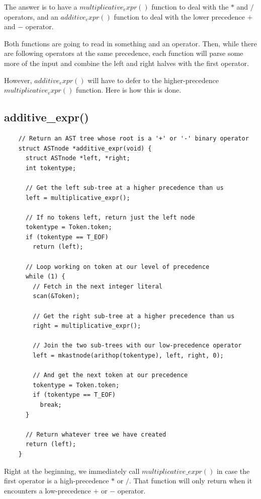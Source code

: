 \documentclass[journal, onecolumn, 12pt]{IEEEtran}
\begin{document}
The answer is to have a $multiplicative_expr()$ function to deal with the $*$ and $/$ operators, and an $additive_expr()$ function to deal with the lower precedence $+$ and $-$ operator.

Both functions are going to read in something and an operator. Then, while there are following operators at the same precedence, each function will parse some more of the input and combine the left and right halves with the first operator.

However, $additive_expr()$ will have to defer to the higher-precedence $multiplicative_expr()$ function. Here is how this is done.

\subsection{additive\_expr()}

\begin{lstlisting}
    // Return an AST tree whose root is a '+' or '-' binary operator
    struct ASTnode *additive_expr(void) {
      struct ASTnode *left, *right;
      int tokentype;

      // Get the left sub-tree at a higher precedence than us
      left = multiplicative_expr();

      // If no tokens left, return just the left node
      tokentype = Token.token;
      if (tokentype == T_EOF)
        return (left);

      // Loop working on token at our level of precedence
      while (1) {
        // Fetch in the next integer literal
        scan(&Token);

        // Get the right sub-tree at a higher precedence than us
        right = multiplicative_expr();

        // Join the two sub-trees with our low-precedence operator
        left = mkastnode(arithop(tokentype), left, right, 0);

        // And get the next token at our precedence
        tokentype = Token.token;
        if (tokentype == T_EOF)
          break;
      }

      // Return whatever tree we have created
      return (left);
    }
\end{lstlisting}

Right at the beginning, we immediately call $multiplicative\_expr()$ in case the first operator is a high-precedence $*$ or $/$. That function will only return when it encounters a low-precedence $+$ or $-$ operator.
\end{document}
